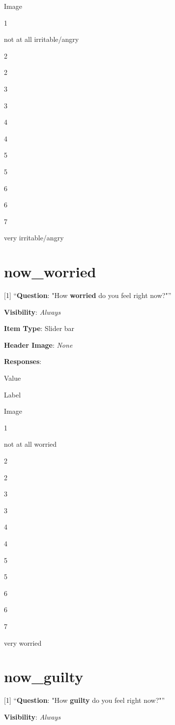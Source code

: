 \documentclass[]{book}
\begin{document}
Image

1

not at all irritable/angry

2

2

3

3

4

4

5

5

6

6

7

very irritable/angry

\hypertarget{now_worried}{%
\section{now\_worried}\label{now_worried}}

{[}1{]} ``\textbf{Question}: "How \textbf{worried} do you feel right now?"''

\textbf{Visibility}: \emph{Always}

\textbf{Item Type}: Slider bar

\textbf{Header Image}: \emph{None}

\textbf{Responses}:

Value

Label

Image

1

not at all worried

2

2

3

3

4

4

5

5

6

6

7

very worried

\hypertarget{now_guilty}{%
\section{now\_guilty}\label{now_guilty}}

{[}1{]} ``\textbf{Question}: "How \textbf{guilty} do you feel right now?"''

\textbf{Visibility}: \emph{Always}
\end{document}
